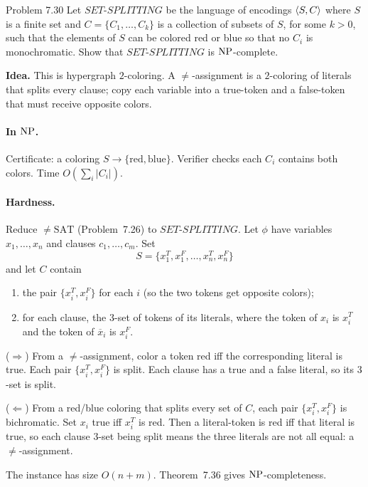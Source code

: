 \begin{question}{Problem 7.30}
Let $\mathit{SET\text{-}SPLITTING}$ be the language of encodings $\langle S,C\rangle$ where $S$ is a finite set and $C=\{C_1,\dots,C_k\}$ is a collection of subsets of $S$, for some $k>0$, such that the elements of $S$ can be colored red or blue so that no $C_i$ is monochromatic. Show that $\mathit{SET\text{-}SPLITTING}$ is $\mathrm{NP}$-complete.
\end{question}
\begin{soln}
\textbf{Idea.} This is hypergraph $2$-coloring. A $\neq$-assignment is a $2$-coloring of literals that splits every clause; copy each variable into a true-token and a false-token that must receive opposite colors.

\paragraph{In $\mathrm{NP}$.}
Certificate: a coloring $S\to\{\mathrm{red},\mathrm{blue}\}$. Verifier checks each $C_i$ contains both colors. Time $O(\sum_i|C_i|)$.

\paragraph{Hardness.}
Reduce $\neq\mathrm{SAT}$ (Problem~7.26) to $\mathit{SET\text{-}SPLITTING}$. Let $\phi$ have variables $x_1,\dots,x_n$ and clauses $c_1,\dots,c_m$. Set
\[
S=\{x_1^T,x_1^F,\dots,x_n^T,x_n^F\}
\]
and let $C$ contain
\begin{enumerate}
\item the pair $\{x_i^T,x_i^F\}$ for each $i$ (so the two tokens get opposite colors);
\item for each clause, the $3$-set of tokens of its literals, where the token of $x_i$ is $x_i^T$ and the token of $\overline{x}_i$ is $x_i^F$.
\end{enumerate}

($\Rightarrow$) From a $\neq$-assignment, color a token red iff the corresponding literal is true. Each pair $\{x_i^T,x_i^F\}$ is split. Each clause has a true and a false literal, so its $3$-set is split.

($\Leftarrow$) From a red/blue coloring that splits every set of $C$, each pair $\{x_i^T,x_i^F\}$ is bichromatic. Set $x_i$ true iff $x_i^T$ is red. Then a literal-token is red iff that literal is true, so each clause $3$-set being split means the three literals are not all equal: a $\neq$-assignment.

The instance has size $O(n+m)$. Theorem~7.36 gives $\mathrm{NP}$-completeness.
\end{soln}

